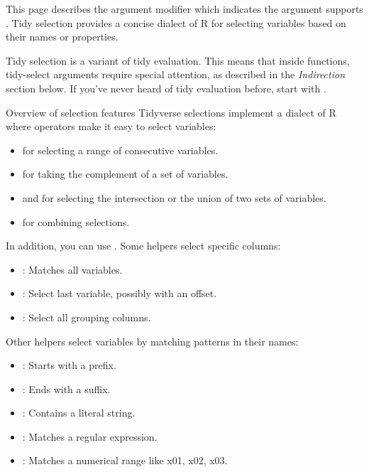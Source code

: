 \documentclass[a4paper]{book}
\begin{document}
%
\begin{Description}
This page describes the  argument modifier which indicates
the argument supports . Tidy selection provides a concise
dialect of R for selecting variables based on their names or properties.

Tidy selection is a variant of tidy evaluation. This means that inside
functions, tidy-select arguments require special attention, as described in
the \emph{Indirection} section below. If you've never heard of tidy evaluation
before, start with .
\end{Description}
%
\begin{Section}{Overview of selection features}
Tidyverse selections implement a dialect of R where operators make
it easy to select variables:
\begin{itemize}

\item{} \code{:} for selecting a range of consecutive variables.
\item{} \code{!} for taking the complement of a set of variables.
\item{} \code{\&} and \code{|} for selecting the intersection or the union of two
sets of variables.
\item{}  for combining selections.

\end{itemize}


In addition, you can use . Some helpers select specific
columns:
\begin{itemize}

\item{} : Matches all variables.
\item{} : Select last variable, possibly with an offset.
\item{} : Select all grouping columns.

\end{itemize}


Other helpers select variables by matching patterns in their names:
\begin{itemize}

\item{} : Starts with a prefix.
\item{} : Ends with a suffix.
\item{} : Contains a literal string.
\item{} : Matches a regular expression.
\item{} : Matches a numerical range like x01, x02, x03.


\end{itemize}
\end{Section}
\end{document}
